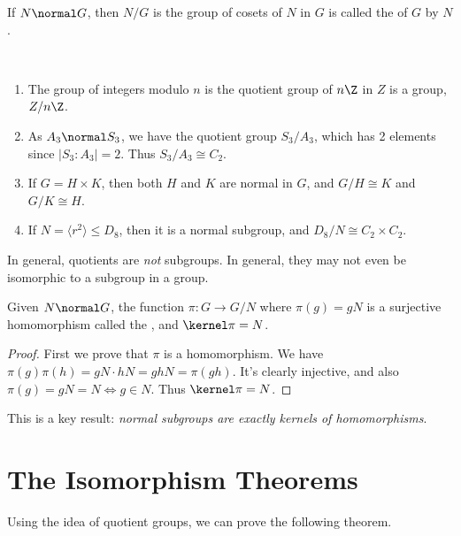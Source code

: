 \documentclass[a4]{scrreprt}
\begin{document}
\begin{definition}
	If $N \normal G$, then $N/G$ is the group of cosets of $N$ in $G$ is called the  of $G$ by $N$.
\end{definition}

\begin{example}~
	    \vspace*{-1.5\baselineskip}
	\begin{enumerate}[label=(\roman*)]
		\item The group of integers modulo $n$ is the quotient group of $n\Z$ in $Z$ is a group, $Z/n\Z$.
		\item As $A_3 \normal S_3$, we have the quotient group $S_3/A_3$, which has 2 elements since $|S_3 : A_3| = 2$. Thus $S_3 / A_3 \cong C_2$.
		\item If $G = H \times K$, then both $H$ and $K$ are normal in $G$, and $G/H \cong K$ and $G/K \cong H$.
		\item If $N = \langle r^2 \rangle \leq D_8$, then it is a normal subgroup, and $D_8/N \cong C_2 \times C_2$. 
	\end{enumerate}
\end{example}

\begin{remark}
	In general, quotients are \emph{not} subgroups. In general, they may not even be isomorphic to a subgroup in a group.
\end{remark}

\begin{theorem}
	Given $N \normal G$, the function $\pi : G \rightarrow G/N$ where $\pi(g) = gN$ is a surjective homomorphism called the , and $\kernel \pi = N$.
\end{theorem}
\begin{proof}
	First we prove that $\pi$ is a homomorphism. We have $\pi(g)\pi(h) = gN \cdot hN = gh N = \pi(gh)$. It's clearly injective, and also $\pi(g)= gN = N \iff g \in N$. Thus $\kernel \pi = N$.
\end{proof}

This is a key result: \emph{normal subgroups are exactly kernels of homomorphisms}.

\section{The Isomorphism Theorems}

Using the idea of quotient groups, we can prove the following theorem.
\end{document}
